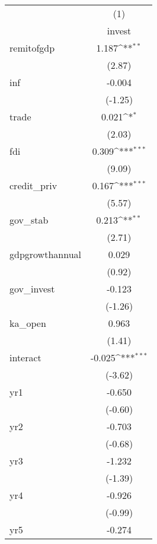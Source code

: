 {
\def\sym#1{\ifmmode^{#1}\else\(^{#1}\)\fi}
\begin{tabular}{l*{1}{c}}
\hline\hline
            &\multicolumn{1}{c}{(1)}\\
            &\multicolumn{1}{c}{invest}\\
\hline
remitofgdp  &       1.187\sym{**} \\
            &      (2.87)         \\
[1em]
inf         &      -0.004         \\
            &     (-1.25)         \\
[1em]
trade       &       0.021\sym{*}  \\
            &      (2.03)         \\
[1em]
fdi         &       0.309\sym{***}\\
            &      (9.09)         \\
[1em]
credit\_priv &       0.167\sym{***}\\
            &      (5.57)         \\
[1em]
gov\_stab    &       0.213\sym{**} \\
            &      (2.71)         \\
[1em]
gdpgrowthannual&       0.029         \\
            &      (0.92)         \\
[1em]
gov\_invest  &      -0.123         \\
            &     (-1.26)         \\
[1em]
ka\_open     &       0.963         \\
            &      (1.41)         \\
[1em]
interact    &      -0.025\sym{***}\\
            &     (-3.62)         \\
[1em]
yr1         &      -0.650         \\
            &     (-0.60)         \\
[1em]
yr2         &      -0.703         \\
            &     (-0.68)         \\
[1em]
yr3         &      -1.232         \\
            &     (-1.39)         \\
[1em]
yr4         &      -0.926         \\
            &     (-0.99)         \\
[1em]
yr5         &      -0.274         \\

\end{tabular}}
